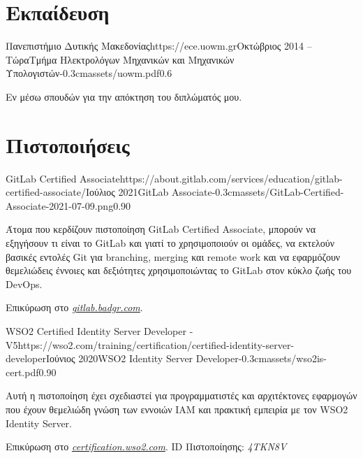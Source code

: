 \documentclass{mycv}
\begin{document}
	\section{Εκπαίδευση}

	\begin{EntryDatedLogo}{Πανεπιστήμιο Δυτικής Μακεδονίας}{https://ece.uowm.gr}{Οκτώβριος 2014 -- Τώρα}{Τμήμα Ηλεκτρολόγων Μηχανικών και Μηχανικών Υπολογιστών}{-0.3cm}{assets/uowm.pdf}{0.6}
	\begin{Itemize}
		\item Εν μέσω σπουδών για την απόκτηση του διπλώματός μου.
	\end{Itemize}
	\end{EntryDatedLogo}

	\section{Πιστοποιήσεις}
    \begin{EntryDatedLogo}{GitLab Certified Associate}{https://about.gitlab.com/services/education/gitlab-certified-associate/}{Ιούλιος 2021}{GitLab Associate}{-0.3cm}{assets/GitLab-Certified-Associate-2021-07-09.png}{0.90}
		\begin{Itemize}
			\item Άτομα που κερδίζουν πιστοποίηση GitLab Certified Associate, μπορούν να εξηγήσουν τι είναι το GitLab και γιατί το χρησιμοποιούν οι ομάδες, να εκτελούν βασικές εντολές Git για branching, merging και remote work και να εφαρμόζουν θεμελιώδεις έννοιες και δεξιότητες χρησιμοποιώντας το GitLab στον κύκλο ζωής του DevOps. 
			\item Επικύρωση στο \href{https://gitlab.badgr.com/public/assertions/Hw6j8Th9SyKNj8ehsQkqAw}{\textit{gitlab.badgr.com}}.
		\end{Itemize}
	\end{EntryDatedLogo}

	\vspace{0.75cm}

	\begin{EntryDatedLogo}{WSO2 Certified Identity Server
			Developer - V5}{https://wso2.com/training/certification/certified-identity-server-developer}{Ιούνιος 2020}{WSO2 Identity Server Developer}{-0.3cm}{assets/wso2is-cert.pdf}{0.90}
		\begin{Itemize}
			\item Αυτή η πιστοποίηση έχει σχεδιαστεί για προγραμματιστές και αρχιτέκτονες εφαρμογών που έχουν θεμελιώδη γνώση των εννοιών IAM και πρακτική εμπειρία με τον WSO2 Ιdentity Server. 
			\item Επικύρωση στο \href{https://certification.wso2.com}{\textit{certification.wso2.com}}. ID Πιστοποίησης: \textit{4TKN8V}
		\end{Itemize}
	\end{EntryDatedLogo}
\end{document}
